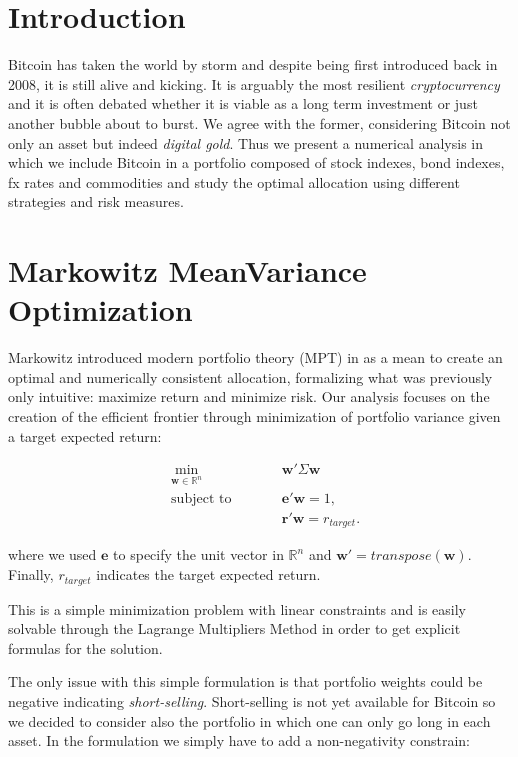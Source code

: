 \documentclass[12pt]{elsarticle}
\begin{document}
\section{Introduction}
\label{intro}
Bitcoin has taken the world by storm and despite being first introduced back in 2008, it is still alive and kicking. It is arguably the most resilient \textit{cryptocurrency} and it is often debated
whether it is viable as a long term investment or just another bubble about to burst. We agree with the former, considering Bitcoin not only an asset but indeed \textit{digital gold}.
Thus we present a numerical analysis in which we include Bitcoin in a portfolio composed of stock indexes, bond indexes, fx rates and commodities and study the optimal allocation using different strategies and risk measures.




\section{Markowitz MeanVariance Optimization}
Markowitz introduced modern portfolio theory (MPT) in \cite{MARKOWITZ52} as a mean to create an optimal and numerically consistent allocation, formalizing what was previously only intuitive: maximize return and minimize risk. 
Our analysis focuses on the creation of the efficient frontier through minimization of portfolio variance given a target expected return:

\begin{subequations}
\begin{align}
&\!\min_{\mathbf{w}\in \mathbb{R}^{n}}        &\qquad& \mathbf{w} ' \Sigma \mathbf{w} \\
& \text{subject to} &      & \mathbf{e}'\mathbf{w} = 1 ,\label{eq:constraint1}\\
&                  &      & \mathbf{r}'\mathbf{w} = r_{target}.\label{eq:constraint2}
\end{align}
\end{subequations}

where we used $\mathbf{e}$ to specify the unit vector in $\mathbb{R}^{n}$ and $\mathbf{w}' =  transpose(\mathbf{w} )$. Finally, $r_{target}$ indicates the target expected return.

This is a simple minimization problem with linear constraints and is easily solvable through the Lagrange Multipliers Method in order to get explicit formulas for the solution.

The only issue with this simple formulation is that portfolio weights could be negative indicating \textit{short-selling}. Short-selling is not yet available for Bitcoin so we decided to consider also the portfolio in which one can only go long in each asset.
In the formulation we simply have to add a non-negativity constrain:
\end{document}

